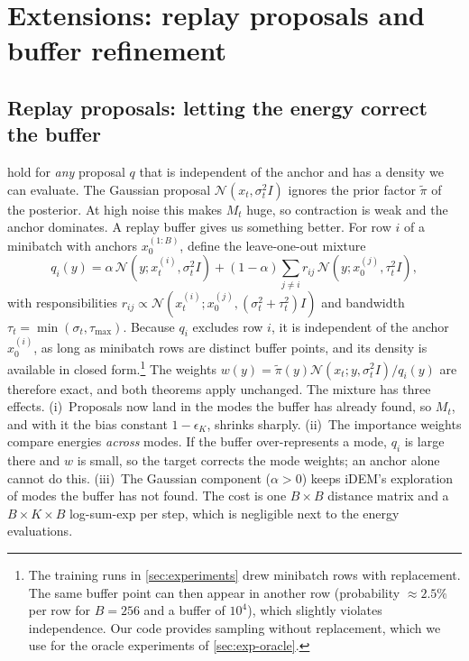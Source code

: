 \section{Extensions: replay proposals and buffer refinement}
\label{app:ext}
\subsection{Replay proposals: letting the energy correct the buffer}
\label{sec:replay}
 hold for \emph{any} proposal $q$ that is independent of the anchor and has a density we can evaluate. The Gaussian proposal $\mathcal{N}(x_t,\sigma_t^2I)$ ignores the prior factor $\tilde\pi$ of the posterior. At high noise this makes $M_t$ huge, so contraction is weak and the anchor dominates.
A replay buffer gives us something better. For row $i$ of a minibatch with anchors $x_0^{(1:B)}$, define the leave-one-out mixture
\begin{equation}
q_i(y)=\alpha\,\mathcal{N}(y;x_t^{(i)},\sigma_t^2I)+(1-\alpha)\!\sum_{j\neq i}r_{ij}\,\mathcal{N}(y;x_0^{(j)},\tau_t^2I),
\label{eq:replay}
\end{equation}
with responsibilities $r_{ij}\propto\mathcal{N}(x_t^{(i)};x_0^{(j)},(\sigma_t^2+\tau_t^2)I)$ and bandwidth $\tau_t=\min(\sigma_t,\tau_{\max})$.
Because $q_i$ excludes row $i$, it is independent of the anchor $x_0^{(i)}$, as long as minibatch rows are distinct buffer points, and its density is available in closed form.\footnote{The training runs in \cref{sec:experiments} drew minibatch rows with replacement. The same buffer point can then appear in another row (probability $\approx2.5\%$ per row for $B=256$ and a buffer of $10^4$), which slightly violates independence. Our code provides sampling without replacement, which we use for the oracle experiments of \cref{sec:exp-oracle}.}
The weights $w(y)=\tilde\pi(y)\mathcal{N}(x_t;y,\sigma_t^2I)/q_i(y)$ are therefore exact, and both theorems apply unchanged.
The mixture has three effects.
(i)~Proposals now land in the modes the buffer has already found, so $M_t$, and with it the bias constant $1-\epsilon_K$, shrinks sharply.
(ii)~The importance weights compare energies \emph{across} modes. If the buffer over-represents a mode, $q_i$ is large there and $w$ is small, so the target corrects the mode weights; an anchor alone cannot do this.
(iii)~The Gaussian component ($\alpha>0$) keeps iDEM's exploration of modes the buffer has not found.
The cost is one $B\times B$ distance matrix and a $B\times K\times B$ log-sum-exp per step, which is negligible next to the energy evaluations.

